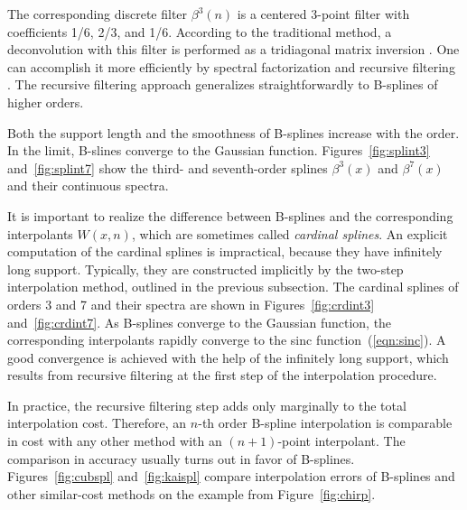 The corresponding discrete filter $\beta^3(n)$ is a centered 3-point
filter with coefficients 1/6, 2/3, and 1/6. According to the
traditional method, a deconvolution with this filter is performed as a
tridiagonal matrix inversion \cite{deBoor}. One can accomplish it more
efficiently by spectral factorization and recursive filtering
\cite{unser1}. The recursive filtering approach generalizes
straightforwardly to B-splines of higher orders.
\par
Both the support length and the smoothness of B-splines increase with
the order. In the limit, B-slines converge to the Gaussian function.
Figures~\ref{fig:splint3} and~\ref{fig:splint7} show the third- and
seventh-order splines $\beta^3(x)$ and $\beta^7(x)$ and their
continuous spectra.



\par
It is important to realize the difference between B-splines and the
corresponding interpolants $W(x,n)$, which are sometimes called
\emph{cardinal splines}.  An explicit computation of the cardinal
splines is impractical, because they have infinitely long support.
Typically, they are constructed implicitly by the two-step
interpolation method, outlined in the previous subsection. The
cardinal splines of orders 3 and 7 and their spectra are shown in
Figures~\ref{fig:crdint3} and~\ref{fig:crdint7}. As B-splines converge
to the Gaussian function, the corresponding interpolants rapidly
converge to the sinc function~(\ref{eqn:sinc}). A good convergence
is achieved with the help of the infinitely long support, which
results from recursive filtering at the first step of the
interpolation procedure.


\par
{}
In practice, the recursive filtering step adds only marginally to the
total interpolation cost. Therefore, an $n$-th order B-spline
interpolation is comparable in cost with any other method with an
$(n+1)$-point interpolant. The comparison in accuracy usually turns
out in favor of B-splines. Figures~\ref{fig:cubspl}
and~\ref{fig:kaispl} compare interpolation errors of B-splines and
other similar-cost methods on the example from Figure~\ref{fig:chirp}.

